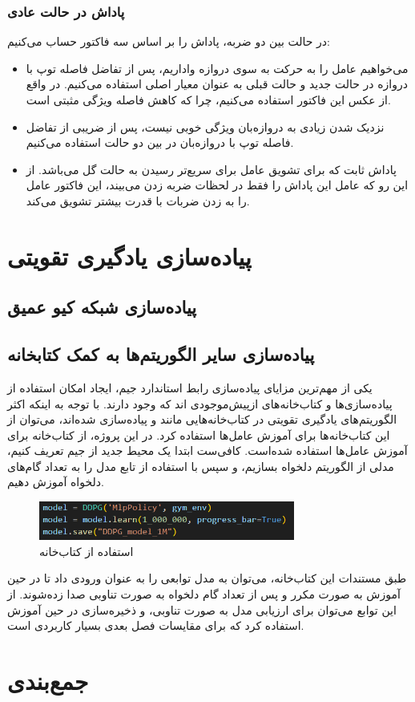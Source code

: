 \subsubsection{پاداش در حالت عادی}
در حالت بین دو ضربه، پاداش را بر اساس سه فاکتور حساب می‌کنیم:
\begin{itemize}
    \item می‌خواهیم عامل را به حرکت به سوی دروازه واداریم، پس از تفاضل فاصله توپ با دروازه در حالت جدید و حالت قبلی به عنوان معیار اصلی استفاده می‌کنیم. در واقع از عکس این فاکتور استفاده می‌کنیم، چرا که کاهش فاصله ویژگی مثبتی است.
    \item نزدیک شدن زیادی به دروازه‌بان ویژگی خوبی نیست، پس از ضریبی از تفاضل فاصله توپ با دروازه‌بان در بین دو حالت استفاده می‌کنیم.
    \item پاداش ثابت  که برای تشویق عامل برای سریع‌تر رسیدن به حالت گل می‌باشد. از این رو که عامل این پاداش را فقط در لحظات ضربه زدن می‌بیند، این فاکتور عامل را به زدن ضربات با قدرت بیشتر تشویق می‌کند.
\end{itemize}
\section{پیاده‌سازی یادگیری تقویتی}
\subsection{پیاده‌سازی شبکه کیو عمیق}
\subsection{پیاده‌سازی سایر الگوریتم‌ها به کمک کتابخانه}
یکی از مهم‌ترین مزایای پیاده‌سازی رابط استاندارد جیم، ایجاد امکان استفاده از پیاده‌سازی‌ها و کتاب‌خانه‌های از‌پیش‌موجودی اند که وجود دارند.
با توجه به اینکه اکثر الگوریتم‌های یادگیری تقویتی در کتاب‌خانه‌هایی مانند  و  پیاده‌سازی شده‌اند،
می‌توان از این کتاب‌خانه‌ها برای آموزش عامل‌ها استفاده کرد.
در این پروژه، از کتاب‌خانه  برای آموزش عامل‌ها استفاده شده‌است.
کافی‌ست ابتدا یک محیط جدید از جیم تعریف کنیم، مدلی از الگوریتم دلخواه بسازیم، و سپس با استفاده از تابع 
مدل را به تعداد گام‌های دلخواه آموزش دهیم.
\begin{figure}[H]
    \centering
    \includegraphics[width=0.75\textwidth]{images/sb3.png}
    \caption{استفاده از کتاب‌خانه }\label{fig:sb3}
\end{figure}
طبق مستندات این کتاب‌خانه، می‌توان به مدل توابعی را به عنوان ورودی داد تا در حین آموزش به صورت مکرر و پس از تعداد گام دلخواه به صورت تناوبی صدا زده‌شوند.
 از این توابع می‌توان برای ارزیابی مدل به صورت تناوبی، و ذخیره‌سازی در حین آموزش استفاده کرد که برای مقایسات فصل بعدی بسیار کاربردی است.
\section{جمع‌بندی}
